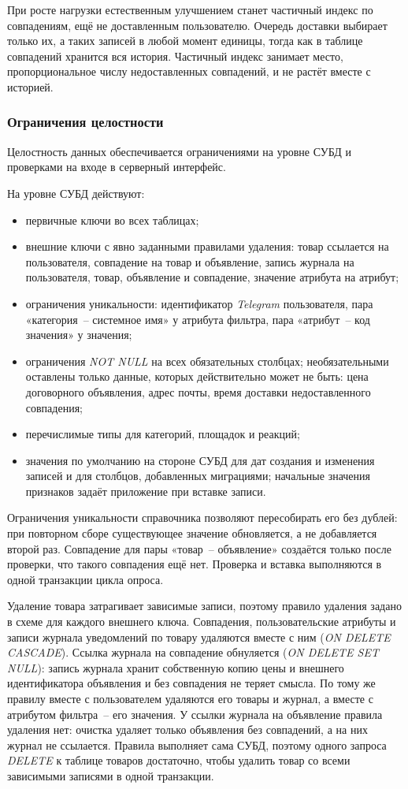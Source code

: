 При росте нагрузки естественным улучшением станет частичный индекс по совпадениям, ещё не доставленным пользователю. Очередь доставки выбирает только их, а таких записей в любой момент единицы, тогда как в таблице совпадений хранится вся история. Частичный индекс занимает место, пропорциональное числу недоставленных совпадений, и не растёт вместе с историей.

\subsubsection{Ограничения целостности}

Целостность данных обеспечивается ограничениями на уровне СУБД и проверками на входе в серверный интерфейс.

На уровне СУБД действуют:
\begin{itemize}
	\item первичные ключи во всех таблицах;
	\item внешние ключи с явно заданными правилами удаления: товар ссылается на пользователя, совпадение на товар и объявление, запись журнала на пользователя, товар, объявление и совпадение, значение атрибута на атрибут;
	\item ограничения уникальности: идентификатор \textit{Telegram} пользователя, пара «категория~-- системное имя» у атрибута фильтра, пара «атрибут~-- код значения» у значения;
	\item ограничения \textit{NOT NULL} на всех обязательных столбцах; необязательными оставлены только данные, которых действительно может не быть: цена договорного объявления, адрес почты, время доставки недоставленного совпадения;
	\item перечислимые типы для категорий, площадок и реакций;
	\item значения по умолчанию на стороне СУБД для дат создания и изменения записей и для столбцов, добавленных миграциями; начальные значения признаков задаёт приложение при вставке записи.
\end{itemize}

Ограничения уникальности справочника позволяют пересобирать его без дублей: при повторном сборе существующее значение обновляется, а не добавляется второй раз. Совпадение для пары «товар~-- объявление» создаётся только после проверки, что такого совпадения ещё нет. Проверка и вставка выполняются в одной транзакции цикла опроса.

Удаление товара затрагивает зависимые записи, поэтому правило удаления задано в схеме для каждого внешнего ключа. Совпадения, пользовательские атрибуты и записи журнала уведомлений по товару удаляются вместе с ним (\textit{ON DELETE CASCADE}). Ссылка журнала на совпадение обнуляется (\textit{ON DELETE SET NULL}): запись журнала хранит собственную копию цены и внешнего идентификатора объявления и без совпадения не теряет смысла. По тому же правилу вместе с пользователем удаляются его товары и журнал, а вместе с атрибутом фильтра~-- его значения. У ссылки журнала на объявление правила удаления нет: очистка удаляет только объявления без совпадений, а на них журнал не ссылается. Правила выполняет сама СУБД, поэтому одного запроса \textit{DELETE} к таблице товаров достаточно, чтобы удалить товар со всеми зависимыми записями в одной транзакции.

